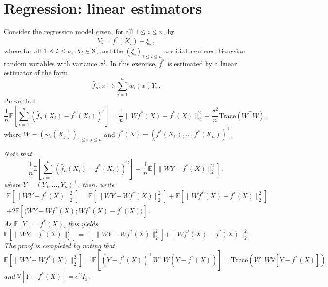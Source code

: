 \documentclass[a4paper,10pt,fleqn]{article}
\newcommand{\eqsp}{\,}
\newcommand{\xset}{\ensuremath{\mathsf{X}}}
\newcommand{\1}{\ensuremath{\mathbbm{1}}}
\newcommand{\bE}{\mathbb{E}}
\begin{document}
\section*{Regression: linear estimators}
Consider the regression model given, for all $1\leqslant i\leqslant n$, by
$$
Y_{i}=f^*(X_{i})+\xi_{i}\eqsp,
$$
where for all $1\leqslant i\leqslant n$, $X_i\in\xset$, and the $(\xi_{i})_{1\leqslant i \leqslant n}$ are i.i.d. centered Gaussian random variables with variance $\sigma^2$. In this exercise, $f^*$ is estimated by a linear estimator of the form
$$
\widehat f_n: x \mapsto \sum_{i = 1}^n w_i(x)Y_i\eqsp.
$$
Prove that
$$
\frac{1}{n}\bE\left[\sum_{i=1}^n(\widehat f_n(X_i) - f^*(X_i))^2\right] = \frac{1}{n}\|Wf^*(X) - f^*(X)\|_2^2 + \frac{\sigma^2}{n}\mathrm{Trace}(W^\top W)\eqsp, 
$$
where $W = (w_i(X_j))_{1\leqslant i,j \leqslant n}$ and $f^*(X) = (f^*(X_1),\ldots,f^*(X_n))^\top$.

\vspace{.2cm}

{\em
Note that
$$
\frac{1}{n}\bE\left[\sum_{i=1}^n(\widehat f_n(X_i) - f^*(X_i))^2\right] = \frac{1}{n}\bE\left[\|WY - f^*(X)\|_2^2\right]\eqsp,
$$
where $Y = (Y_1,\ldots,Y_n)^\top$. then, write
\begin{multline*}
\bE\left[\|WY - f^*(X)\|_2^2\right] = \bE\left[\|WY - Wf^*(X)\|_2^2\right] + \bE\left[\|Wf^*(X) - f^*(X)\|_2^2\right]\\ + 2\bE\left[\langle WY - Wf^*(X); Wf^*(X) - f^*(X)\rangle\right]\eqsp.
\end{multline*}
As $\bE[Y] = f^*(X)$, this yields
$$
\bE\left[\|WY - f^*(X)\|_2^2\right] = \bE\left[\|WY - Wf^*(X)\|_2^2\right] + \|Wf^*(X) - f^*(X)\|_2^2\eqsp.
$$
The proof is completed by noting that
$$
 \bE\left[\|WY - Wf^*(X)\|_2^2\right] =  \bE\left[(Y - f^*(X))^\top W^\top W(Y - f^*(X))\right] = \mathrm{Trace}\left(  W^\top W \mathbb{V}[Y - f^*(X)]\right)
$$
and $\mathbb{V}[Y - f^*(X)] = \sigma^2 I_n$.
}
\end{document}
